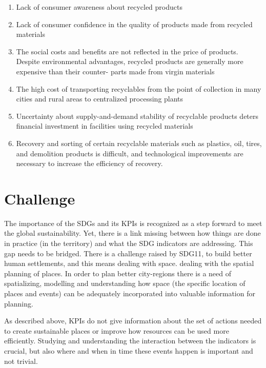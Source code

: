 \begin{enumerate}
    \item Lack of consumer awareness about recycled products
    \item Lack of consumer confidence in the quality of products made from recycled materials
    \item The social costs and benefits are not reflected in the price of products. Despite environmental advantages, recycled products are generally more expensive than their counter- parts made from virgin materials
    \item The high cost of transporting recyclables from the point of collection in many cities and rural areas to centralized processing plants
    \item Uncertainty about supply-and-demand stability of recyclable products deters financial investment in facilities using recycled materials
    \item Recovery and sorting of certain recyclable materials such as plastics, oil, tires, and demolition products is difficult, and technological improvements are necessary to increase the efficiency of recovery.
\end{enumerate}







\section{Challenge}
The importance of the SDGs and its KPIs is recognized as a step forward to meet the global sustainability. Yet, there is a link missing between how things are done in practice (in the territory) and what the SDG indicators are addressing. This gap needs to be bridged. There is a challenge raised by SDG11, to build better human settlements, and this means dealing with space. dealing with the spatial planning of places. In order to plan better city-regions there is a need of spatializing, modelling and understanding how space (the specific location of places and events) can be adequately incorporated into valuable information for planning. \par

As described above, KPIs do not give information about the set of actions needed to create sustainable places or improve how resources can be used more efficiently. Studying and understanding the interaction between the indicators is crucial, but also where  and when in time these events happen is important and not trivial. \par

